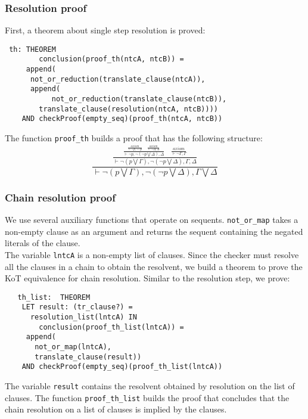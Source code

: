 \documentclass[a4paper,12pt]{article}
\begin{document}
\subsubsection{Resolution proof}
First, a theorem about single step resolution is proved:
\begin{verbatim}
 th: THEOREM  
      	conclusion(proof_th(ntcA, ntcB)) = 
	 append(
	  not_or_reduction(translate_clause(ntcA)), 
	  append(
	  	   not_or_reduction(translate_clause(ntcB)), 
	    translate_clause(resolution(ntcA, ntcB))))
	AND checkProof(empty_seq)(proof_th(ntcA, ntcB))
\end{verbatim}

The function \verb|proof_th| builds a proof that has the following structure:
\begin{equation}
 \frac{\displaystyle 
  \frac{\displaystyle 
   \frac{\displaystyle 
    \frac{axiom}{\vdash \neg p, \neg \neg p} \;\;\;\;
    \frac{axiom}{\vdash \neg \Delta, \Delta}}{\vdash \neg p, \neg (\neg p \bigvee \Delta), \Delta} \;\;\;\; 
   \frac{\displaystyle axiom}{\vdash \neg \Gamma, \Gamma}}{\vdash \neg(p \bigvee \Gamma), \neg(\neg p \bigvee \Delta), \Gamma, \Delta}}
  {\vdash \neg(p \bigvee \Gamma), \neg(\neg p \bigvee \Delta), \Gamma \bigvee \Delta}
\end{equation}
 \subsubsection{Chain resolution proof}
We use several auxiliary functions that operate on sequents. \verb|not_or_map| takes a non-empty clause as an argument and 
returns the sequent containing the negated literals of the clause.
\\The variable \verb|lntcA| is a non-empty list of clauses.
Since the checker must resolve all the clauses in a chain to obtain the resolvent, we build a theorem to prove the KoT equivalence
for chain resolution. Similar to the resolution step, we prove:
\begin{verbatim}
   th_list:  THEOREM
  	LET result: (tr_clause?) = 
	  resolution_list(lntcA) IN
        conclusion(proof_th_list(lntcA)) = 
	 append(
	   not_or_map(lntcA), 
	   translate_clause(result))
	AND checkProof(empty_seq)(proof_th_list(lntcA))
\end{verbatim}
The variable \verb|result| contains the resolvent obtained by resolution on the list of clauses. The function 
\verb|proof_th_list| builds the proof that concludes that the chain resolution on a list of clauses is implied by the clauses.
\end{document}
